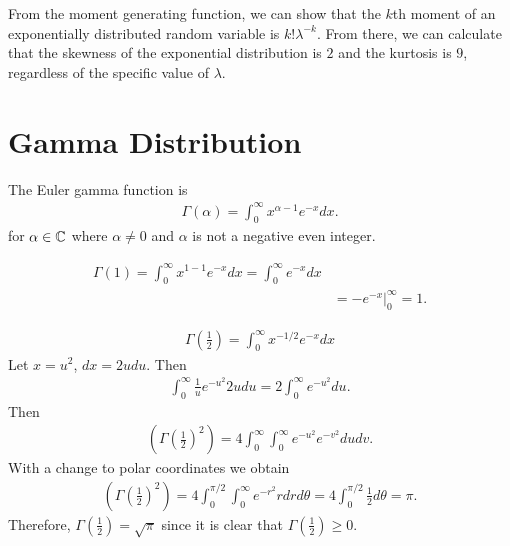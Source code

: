 \begin{rmk}
    From the moment generating function, we can show that the $k$th moment of an exponentially distributed random variable is $k!\lambda^{-k}$. From there, we can calculate that the skewness of the exponential distribution is $2$ and the kurtosis is $9$, regardless of the specific value of $\lambda$.
\end{rmk}

\section{Gamma Distribution}

\begin{defn}
    The Euler gamma function is
    \begin{align*}
        \Gamma(\alpha) = \int_{0}^{\infty}x^{\alpha-1}e^{-x}dx.
    \end{align*}
    for $\alpha \in \mathbb{C}$ where $\alpha \neq 0$ and $\alpha$ is not a negative even integer.
\end{defn}

\begin{exmp}
    \begin{align*}
        \Gamma(1) = \int_{0}^{\infty}x^{1 - 1}e^{-x}dx = \int_{0}^{\infty}e^{-x}dx \\
        &= -e^{-x}\big\rvert_{0}^{\infty} = 1.
    \end{align*}
\end{exmp}

\begin{exmp}
    \begin{align*}
        \Gamma\left(\frac{1}{2}\right) = \int_{0}^{\infty}x^{-1/2}e^{-x}dx
    \end{align*}
    Let $x = u^2$, $dx = 2udu$. Then
    \begin{align*}
        \int_{0}^{\infty}\frac{1}{u}e^{-u^2}2udu = 2\int_{0}^{\infty}e^{-u^2}du.
    \end{align*}
    Then
    \begin{align*}
        \left(\Gamma\left(\frac{1}{2}\right)^2\right) = 4\int_{0}^{\infty}\int_{0}^{\infty}e^{-u^2}e^{-v^2}dudv.
    \end{align*}
    With a change to polar coordinates we obtain
    \begin{align*}
        \left(\Gamma\left(\frac{1}{2}\right)^2\right) = 4\int_{0}^{\pi/2}\int_{0}^{\infty}e^{-r^2}rdrd\theta = 4\int_{0}^{\pi/2}\frac{1}{2}d\theta = \pi.
    \end{align*}
    Therefore, $\Gamma(\frac{1}{2}) = \sqrt{\pi}$ since it is clear that $\Gamma(\frac{1}{2}) \geq 0$.
\end{exmp}

